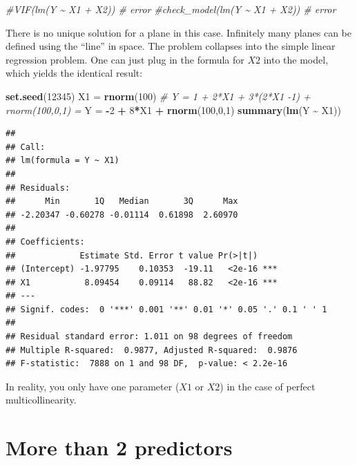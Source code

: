 \documentclass[
]{book}
\newenvironment{Shaded}{\begin{snugshade}}{\end{snugshade}}
\newcommand{\CommentTok}[1]{\textcolor[rgb]{0.56,0.35,0.01}{\textit{#1}}}
\newcommand{\DecValTok}[1]{\textcolor[rgb]{0.00,0.00,0.81}{#1}}
\newcommand{\FunctionTok}[1]{\textcolor[rgb]{0.13,0.29,0.53}{\textbf{#1}}}
\newcommand{\NormalTok}[1]{#1}
\newcommand{\OtherTok}[1]{\textcolor[rgb]{0.56,0.35,0.01}{#1}}
\newcommand{\SpecialCharTok}[1]{\textcolor[rgb]{0.81,0.36,0.00}{\textbf{#1}}}
\begin{document}
\begin{Shaded}
\begin{Highlighting}[]
\CommentTok{\#VIF(lm(Y \textasciitilde{} X1 + X2)) \# error}
\CommentTok{\#check\_model(lm(Y \textasciitilde{} X1 + X2)) \# error}
\end{Highlighting}
\end{Shaded}

There is no unique solution for a plane in this case.
Infinitely many planes can be defined using the ``line'' in space.
The problem collapses into the simple linear regression problem.
One can just plug in the formula for \(X2\) into the model, which yields the identical result:

\begin{Shaded}
\begin{Highlighting}[]
\FunctionTok{set.seed}\NormalTok{(}\DecValTok{12345}\NormalTok{)}
\NormalTok{X1 }\OtherTok{=} \FunctionTok{rnorm}\NormalTok{(}\DecValTok{100}\NormalTok{)}
\CommentTok{\# Y = 1 + 2*X1 + 3*(2*X1 {-}1) + rnorm(100,0,1) = }
\NormalTok{Y }\OtherTok{=} \SpecialCharTok{{-}}\DecValTok{2} \SpecialCharTok{+} \DecValTok{8}\SpecialCharTok{*}\NormalTok{X1 }\SpecialCharTok{+} \FunctionTok{rnorm}\NormalTok{(}\DecValTok{100}\NormalTok{,}\DecValTok{0}\NormalTok{,}\DecValTok{1}\NormalTok{)}
\FunctionTok{summary}\NormalTok{(}\FunctionTok{lm}\NormalTok{(Y }\SpecialCharTok{\textasciitilde{}}\NormalTok{ X1))}
\end{Highlighting}
\end{Shaded}

\begin{verbatim}
## 
## Call:
## lm(formula = Y ~ X1)
## 
## Residuals:
##      Min       1Q   Median       3Q      Max 
## -2.20347 -0.60278 -0.01114  0.61898  2.60970 
## 
## Coefficients:
##             Estimate Std. Error t value Pr(>|t|)    
## (Intercept) -1.97795    0.10353  -19.11   <2e-16 ***
## X1           8.09454    0.09114   88.82   <2e-16 ***
## ---
## Signif. codes:  0 '***' 0.001 '**' 0.01 '*' 0.05 '.' 0.1 ' ' 1
## 
## Residual standard error: 1.011 on 98 degrees of freedom
## Multiple R-squared:  0.9877, Adjusted R-squared:  0.9876 
## F-statistic:  7888 on 1 and 98 DF,  p-value: < 2.2e-16
\end{verbatim}

In reality, you only have one parameter (\(X1\) or \(X2\)) in the case of perfect multicollinearity.

\section{More than 2 predictors}\label{more-than-2-predictors}
\end{document}
